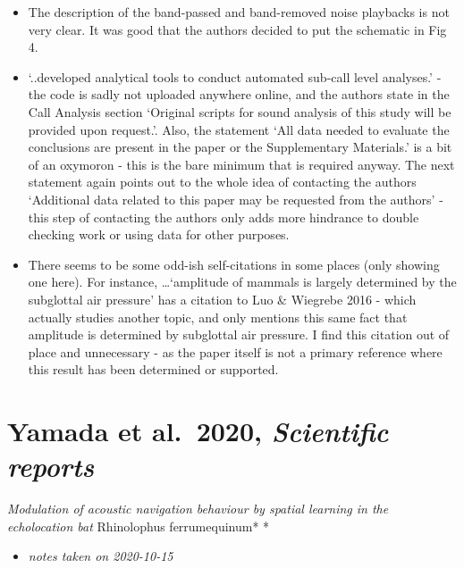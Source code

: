 \documentclass[
]{book}
\providecommand{\tightlist}{%
  \setlength{\itemsep}{0pt}\setlength{\parskip}{0pt}}
\begin{document}
\begin{itemize}
\tightlist
\item
  The description of the band-passed and band-removed noise playbacks is not very clear. It was good that the authors decided to put the schematic in Fig 4.
\item
  `..developed analytical tools to conduct automated sub-call level analyses.' - the code is sadly not uploaded anywhere online, and the authors state in the Call Analysis section `Original scripts for sound analysis of this study will be provided upon request.'. Also, the statement `All data needed to evaluate the conclusions are present in the paper or the Supplementary Materials.' is a bit of an oxymoron - this is the bare minimum that is required anyway. The next statement again points out to the whole idea of contacting the authors `Additional data related to this paper may be requested from the authors' - this step of contacting the authors only adds more hindrance to double checking work or using data for other purposes.
\item
  There seems to be some odd-ish self-citations in some places (only showing one here). For instance, \ldots{}`amplitude of mammals is largely determined by the subglottal air pressure' has a citation to Luo \& Wiegrebe 2016 - which actually studies another topic, and only mentions this same fact that amplitude is determined by subglottal air pressure. I find this citation
  out of place and unnecessary - as the paper itself is not a primary reference where this result has been determined or supported.
\end{itemize}

\hypertarget{yamada-et-al.-2020-scientific-reports}{%
\chapter{\texorpdfstring{Yamada et al.~2020, \emph{Scientific reports}}{Yamada et al.~2020, Scientific reports}}\label{yamada-et-al.-2020-scientific-reports}}


\emph{Modulation of acoustic navigation behaviour by spatial learning in the echolocation bat }Rhinolophus ferrumequinum* * \citep{yamada2020modulation}

\begin{itemize}
\tightlist
\item
  \emph{notes taken on 2020-10-15}
\end{itemize}
\end{document}
